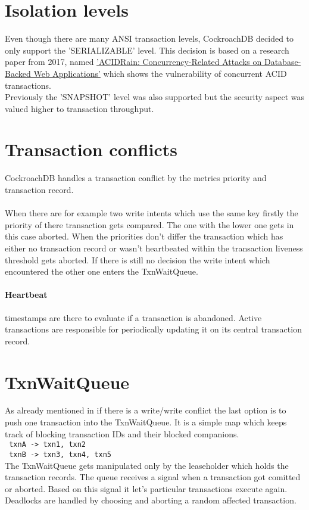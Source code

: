 \documentclass[12pt,a4paper]{article}
\newcommand{\graycode}[1]{\colorbox{codegray}{\texttt{#1}}}
\begin{document}
\section{Isolation levels}
Even though there are many ANSI transaction levels, CockroachDB decided to only support the 'SERIALIZABLE' level.
This decision is based on a research paper from 2017, named \href{http://www.bailis.org/papers/acidrain-sigmod2017.pdf}
{'ACIDRain: Concurrency-Related Attacks on Database-Backed Web Applications'} which shows the vulnerability of concurrent 
ACID transactions.\\
Previously the 'SNAPSHOT' level was also supported but the security aspect was valued higher to transaction throughput.

\section{Transaction conflicts}
\label{sec:transactionconflicts}
CockroachDB handles a transaction conflict by the metrics priority and transaction record.\\\\
When there are for example two write intents which use the same key firstly the priority of there transaction gets compared.
The one with the lower one gets in this case aborted. When the priorities don't differ the transaction which has either no
transaction record or wasn't heartbeated within the transaction liveness threshold gets aborted. If there is still no
decision the write intent which encountered the other one enters the TxnWaitQueue.

\paragraph{Heartbeat} timestamps are there to evaluate if a transaction is abandoned. Active transactions are 
responsible for periodically updating it on its central transaction record. 

\section{TxnWaitQueue}
As already mentioned in  if there is a write/write conflict the last option is to push one
transaction into the TxnWaitQueue. It is a simple map which keeps track of blocking transaction IDs and their blocked 
companions.\\
\graycode{
	txnA -> txn1, txn2
}\\
\graycode{
	txnB -> txn3, txn4, txn5
}
\\The TxnWaitQueue gets manipulated only by the  leaseholder which holds the transaction 
records. The queue receives a signal when a transaction got comitted or aborted. Based on this signal it let's particular
transactions execute again.\\
Deadlocks are handled by choosing and aborting a random affected transaction.
\end{document}
